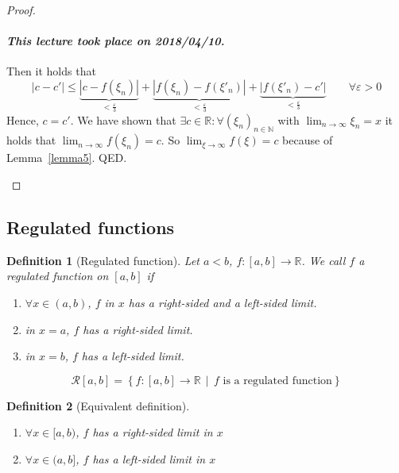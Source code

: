 \documentclass{article}
\newtheorem{definition}{Definition}  \numberwithin{definition}{section}
\newcommand{\setdef}[2]{\left\{\left.#1\,\middle|\,#2\right.\right\}}
\newcommand{\card}[1]{\left|#1\right|}
\newcommand{\dateref}[1]{\paragraph{\textit{This lecture took place on #1.}}}
\begin{document}
\begin{proof}
\begin{description}
      \dateref{2018/04/10}

      Then it holds that
      \[ \card{c - c'} \leq \underbrace{\card{c - f(\xi_n)}}_{< \frac\varepsilon3} + \underbrace{\card{f(\xi_n) - f(\xi'_n)}}_{< \frac\varepsilon3} + \underbrace{\card{f(\xi'_n) - c'}}_{< \frac\varepsilon3} \qquad \forall \varepsilon > 0 \]
      Hence, $c = c'$.
      We have shown that $\exists c \in \mathbb R: \forall (\xi_n)_{n \in \mathbb N}$ with $\lim_{n\to\infty} \xi_n = x$ it holds that
      $\lim_{n\to\infty} f(\xi_n) = c$. So $\lim_{\xi\to\infty} f(\xi) = c$ because of Lemma~\ref{lemma5}. QED.
  \end{description}
\end{proof}

\subsection{Regulated functions}

\begin{definition}[Regulated function] %
  Let $a < b$, $f: [a,b] \to \mathbb R$. We call $f$ a \emph{regulated function on $[a,b]$} if
  \begin{enumerate}
    \item $\forall x \in (a,b)$, $f$ in $x$ has a right-sided and a left-sided limit.
    \item in $x = a$, $f$ has a right-sided limit.
    \item in $x = b$, $f$ has a left-sided limit.
  \end{enumerate}

  \[ \mathcal R[a,b] = \setdef{f: [a,b] \to \mathbb R}{f \text{ is a regulated function}} \]
\end{definition}

\begin{definition}[Equivalent definition]
  \begin{enumerate}
    \item $\forall x \in [a,b)$, $f$ has a right-sided limit in $x$
    \item $\forall x \in (a,b]$, $f$ has a left-sided limit in $x$
  \end{enumerate}
\end{definition}
\end{document}

